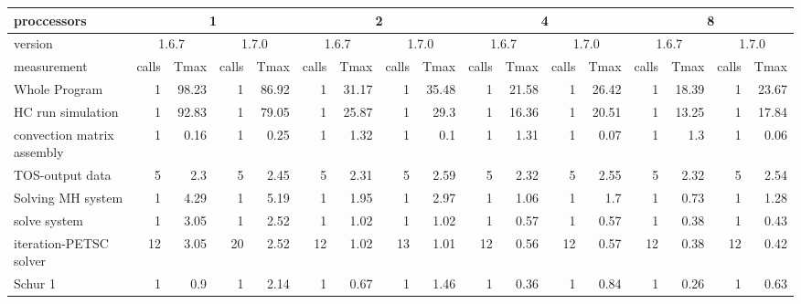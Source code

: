 \begin{sidewaystable}[!htbp]
\scriptsize
\begin{tabular}{|l|r|r|r|r|r|r|r|r|r|r|r|r|r|r|r|r|}
\hline
proccessors                            & \multicolumn{4}{c|}{1} & \multicolumn{4}{c|}{2} & \multicolumn{4}{c|}{4} & \multicolumn{4}{c|}{8} \\
\hline
version                                & \multicolumn{2}{c|}{1.6.7} & \multicolumn{2}{c|}{1.7.0} &  \multicolumn{2}{c|}{1.6.7} & \multicolumn{2}{c|}{1.7.0} &   \multicolumn{2}{c|}{1.6.7} & \multicolumn{2}{c|}{1.7.0} & \multicolumn{2}{c|}{1.6.7} & \multicolumn{2}{c|}{1.7.0}  \\
\hline
measurement                            & calls &  Tmax  & calls  &  Tmax  & calls  &  Tmax  & calls  &  Tmax  & calls  &  Tmax  & calls  &  Tmax  & calls  &  Tmax  & calls  &  Tmax  \\
\hline
Whole Program                          &   1   &   98.23   &   1   &   86.92   &   1   &   31.17   &   1   &   35.48   &   1   &   21.58   &   1   &   26.42   &   1   &   18.39   &   1   &   23.67   \\
 HC run simulation                     &   1   &   92.83   &   1   &   79.05   &   1   &   25.87   &   1   &   29.3    &   1   &   16.36   &   1   &   20.51   &   1   &   13.25   &   1   &   17.84   \\
  convection matrix assembly           &   1   &   0.16    &   1   &   0.25    &   1   &   1.32    &   1   &   0.1 &   1   &   1.31    &   1   &   0.07    &   1   &   1.3 &   1   &   0.06    \\
  TOS-output data                      &   5   &   2.3 &   5   &   2.45    &   5   &   2.31    &   5   &   2.59    &   5   &   2.32    &   5   &   2.55    &   5   &   2.32    &   5   &   2.54    \\
  Solving MH system                    &   1   &   4.29    &   1   &   5.19    &   1   &   1.95    &   1   &   2.97    &   1   &   1.06    &   1   &   1.7 &   1   &   0.73    &   1   &   1.28    \\
   solve system                      &   1   &   3.05    &   1   &   2.52    &   1   &   1.02    &   1   &   1.02    &   1   &   0.57    &   1   &   0.57    &   1   &   0.38    &   1   &   0.43    \\
    iteration-PETSC solver         &   12  &   3.05    &   20  &   2.52    &   12  &   1.02    &   13  &   1.01    &   12  &   0.56    &   12  &   0.57    &   12  &   0.38    &   12  &   0.42    \\
   Schur 1                           &   1   &   0.9 &   1   &   2.14    &   1   &   0.67    &   1   &   1.46    &   1   &   0.36    &   1   &   0.84    &   1   &   0.26    &   1   &   0.63    \\

\end{tabular}
\end{sidewaystable}
